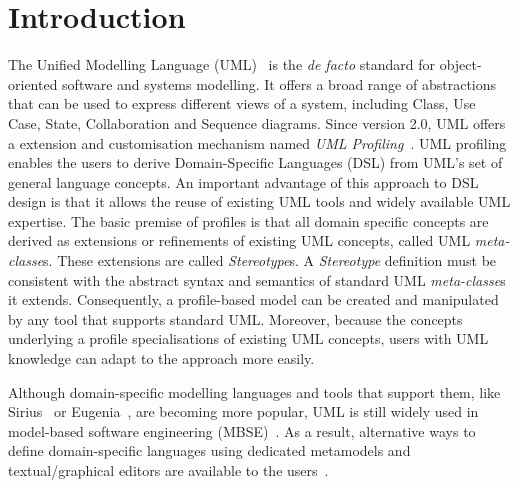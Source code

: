 \section{Introduction}
\label{sec:introduction}

The Unified Modelling Language (UML)~\cite{UML2015OMG} is the \emph{de facto} standard for object-oriented software and systems modelling. 
It offers a broad range of abstractions that can be used to express different views of a system, including Class, Use Case, State, Collaboration and Sequence diagrams. 
Since version 2.0, UML offers a extension and customisation mechanism named \emph{UML Profiling}~\cite{FuentesFernandez2004:UMLME}.
UML profiling enables the users to derive Domain-Specific Languages (DSL) from UML's set of general language concepts.
An important advantage of this approach to DSL design is that it allows the reuse of existing UML tools and widely available UML expertise.
The basic premise of profiles is that all domain specific concepts are derived as extensions or refinements of existing UML concepts, called UML \textit{meta-classe}s. 
These extensions are called \textit{Stereotype}s. 
A \textit{Stereotype} definition must be consistent with the abstract syntax and semantics of standard UML \textit{meta-classe}s it extends. 
Consequently, a profile-based model can be created and manipulated by any tool that supports standard UML. 
Moreover, because the concepts underlying a profile specialisations of existing UML concepts, users with UML knowledge can adapt to the approach more easily.


Although domain-specific modelling languages and tools that support them, like Sirius~\cite{viyovic2014sirius} or Eugenia~\cite{kolovos2015eugenia}, are becoming more popular, UML is still widely used in model-based software engineering (MBSE)~\cite{erickson2007theoretical}. 
As a result, alternative ways to define domain-specific languages using dedicated metamodels and textual/graphical editors are available to the users~\cite{Bergmayr2014:MODELS,Pardillo2010:MODELS}. 

